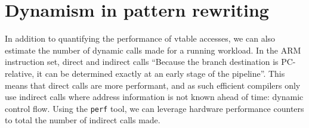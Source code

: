 







\section{Dynamism in pattern rewriting}
\label{chap:dynamism-pattern-rewriting-summary}



In addition to quantifying the performance of \ac{vtable} accesses, we can also estimate the number of dynamic calls made for a running workload.
In the ARM instruction set, direct and indirect calls \cite{armlimitedARMCortexRSeries}
``Because the branch destination is PC-relative, it can be determined exactly at an early stage of the pipeline''. This means that direct calls are more performant, and as such efficient compilers only use indirect calls where address information is not known ahead of time: dynamic control flow.
Using the \texttt{perf} tool, we can leverage hardware performance counters to total the number of indirect calls made.


